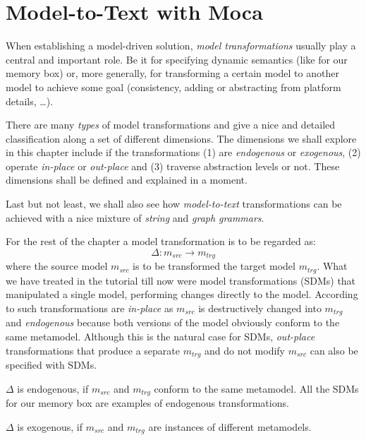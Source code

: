 \chapter{Model-to-Text with Moca}

When establishing a model-driven solution, \emph{model transformations} usually play a central and important role.
Be it for specifying dynamic semantics (like for our memory box) or, more generally, for transforming a certain model to another model to achieve some goal (consistency, adding or abstracting from platform details, \ldots).  

There are many \emph{types} of model transformations and \cite{CH03,Mens_Gorp_2006} give a nice and detailed classification along a set of different dimensions. 
The dimensions we shall explore in this chapter include if the transformations (1) are \emph{endogenous} or \emph{exogenous}, (2) operate \emph{in-place} or \emph{out-place} and (3) traverse abstraction levels or not.
These dimensions shall be defined and explained in a moment.

Last but not least, we shall also see how \emph{model-to-text} transformations can be achieved with a nice mixture of \emph{string} and \emph{graph grammars}. 

For the rest of the chapter a model transformation is to be regarded as:
\begin{displaymath}
 	\Delta: m_{src} \rightarrow m_{trg}
\end{displaymath}
where the source model $m_{src}$ is to be transformed the target model $m_{trg}$.
What we have treated in the tutorial till now were model transformations (SDMs) that manipulated a single model, performing changes directly to the model.
According to \cite{Mens_Gorp_2006} such transformations are \emph{in-place} as $m_{src}$ is destructively changed into $m_{trg}$ and \emph{endogenous} because both versions of the model obviously conform to the same metamodel.
Although this is the natural case for SDMs, \emph{out-place} transformations that produce a separate $m_{trg}$ and do not modify $m_{src}$ can also be specified with SDMs.

\clearpage

$\Delta$ is endogenous, if $m_{src}$ and $m_{trg}$ conform to the same metamodel.
All the SDMs for our memory box are examples of endogenous transformations.

$\Delta$ is exogenous, if $m_{src}$ and $m_{trg}$ are instances of different metamodels.


